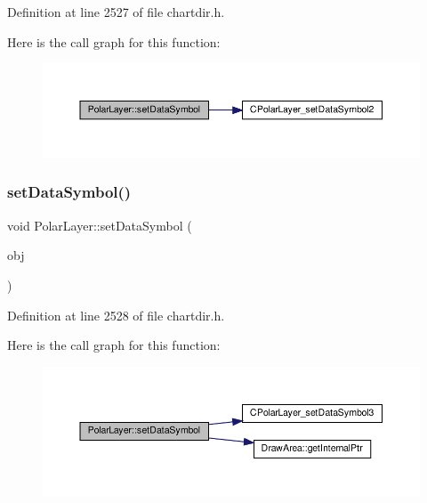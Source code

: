 Definition at line 2527 of file chartdir.\+h.

Here is the call graph for this function\+:
\nopagebreak
\begin{figure}[H]
\begin{center}
\leavevmode
\includegraphics[width=350pt]{class_polar_layer_afea23161a7cef63c1dbdf7525dc33b1d_cgraph}
\end{center}
\end{figure}
\mbox{\label{class_polar_layer_a8da7e1c4f14a9bc874fdeaa89e4b82cb}} 
\subsubsection{\texorpdfstring{set\+Data\+Symbol()}{setDataSymbol()}\hspace{0.1cm}{\footnotesize\ttfamily [2/4]}}
{\footnotesize\ttfamily void Polar\+Layer\+::set\+Data\+Symbol (\begin{DoxyParamCaption}\item[{const \hyperlink{class_draw_area}{Draw\+Area} $\ast$}]{obj }\end{DoxyParamCaption})\hspace{0.3cm}{\ttfamily [inline]}}



Definition at line 2528 of file chartdir.\+h.

Here is the call graph for this function\+:
\nopagebreak
\begin{figure}[H]
\begin{center}
\leavevmode
\includegraphics[width=350pt]{class_polar_layer_a8da7e1c4f14a9bc874fdeaa89e4b82cb_cgraph}
\end{center}
\end{figure}
\mbox{\label{class_polar_layer_a6c2df34e76a9ed25cfa42e1d37d782a3}} 
